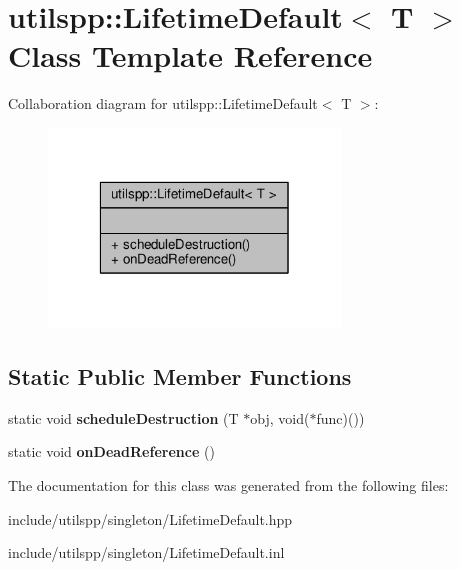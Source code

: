 \hypertarget{classutilspp_1_1LifetimeDefault}{\section{utilspp\-:\-:Lifetime\-Default$<$ T $>$ Class Template Reference}
\label{classutilspp_1_1LifetimeDefault}
}


Collaboration diagram for utilspp\-:\-:Lifetime\-Default$<$ T $>$\-:\nopagebreak
\begin{figure}[H]
\begin{center}
\leavevmode
\includegraphics[width=220pt]{classutilspp_1_1LifetimeDefault__coll__graph}
\end{center}
\end{figure}
\subsection*{Static Public Member Functions}
\begin{DoxyCompactItemize}
\item 
\hypertarget{classutilspp_1_1LifetimeDefault_acdbf1092ebac30c09a8c87207a95eb5e}{static void {\bfseries schedule\-Destruction} (T $\ast$obj, void($\ast$func)())}\label{classutilspp_1_1LifetimeDefault_acdbf1092ebac30c09a8c87207a95eb5e}

\item 
\hypertarget{classutilspp_1_1LifetimeDefault_a8cc3c6a3bb643a0e39416ba3ab97fafb}{static void {\bfseries on\-Dead\-Reference} ()}\label{classutilspp_1_1LifetimeDefault_a8cc3c6a3bb643a0e39416ba3ab97fafb}

\end{DoxyCompactItemize}


The documentation for this class was generated from the following files\-:\begin{DoxyCompactItemize}
\item 
include/utilspp/singleton/Lifetime\-Default.\-hpp\item 
include/utilspp/singleton/Lifetime\-Default.\-inl\end{DoxyCompactItemize}
